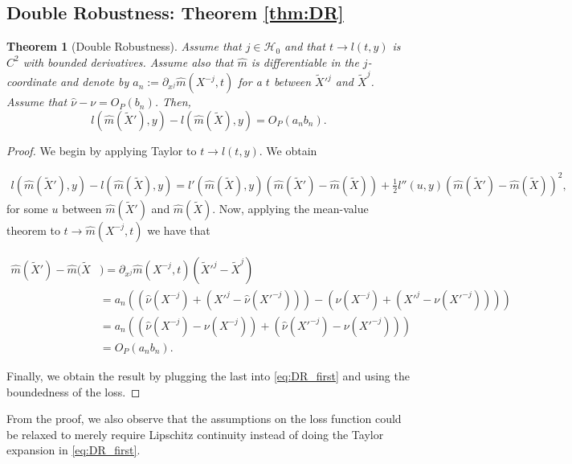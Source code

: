 \documentclass{article}
\theoremstyle{plain}
\newtheorem{theorem}{Theorem}[section]
\theoremstyle{definition}
\theoremstyle{remark}
\begin{document}
 
\subsection{Double Robustness: Theorem \ref{thm:DR}}

 \begin{theorem}[Double Robustness]
 Assume that $j\in \mathcal{H}_0$ and that $t\to l(t, y)$ is $C^2$ with bounded derivatives. Assume also that $\widehat{m}$ is differentiable in the $j$-coordinate and denote by $a_n:=\partial_{x^j}\widehat{m}(X^{-j}, t)$ for a $t$ between $\widetilde{X}'^{j}$ and $\widetilde{X}^j$. Assume that $\widehat{\nu}-\nu=O_P(b_n)$. Then, $$l(\widehat{m}(\widetilde{X}'), y)-l(\widehat{m}(\widetilde{X}), y)=O_P(a_n b_n).$$
 \end{theorem}
 
 
\begin{proof}
 We begin by applying Taylor to $t\to l(t, y)$. We obtain
 
 \begin{align}
     l(\widehat{m}(\widetilde{X}'), y)-l(\widehat{m}(\widetilde{X}), y)=l'(\widehat{m}(\widetilde{X}), y)(\widehat{m}(\widetilde{X}')-\widehat{m}(\widetilde{X}))+\frac{1}{2}l''(u, y)(\widehat{m}(\widetilde{X}')-\widehat{m}(\widetilde{X}))^2,\label{eq:DR_first}
 \end{align}
 for some $u$ between $\widehat{m}(\widetilde{X}')$ and $\widehat{m}(\widetilde{X})$.
 Now, applying the mean-value theorem to $t\to \widehat{m}(X^{-j}, t)$ we have that
 
 \begin{align*}
     \widehat{m}(\widetilde{X}')-\widehat{m}(\widetilde{X}&)=\partial_{x^j}\widehat{m}(X^{-j}, t)(\widetilde{X}'^j-\widetilde{X}^j)\\
     &=a_n\left(\left(\widehat{\nu}(X^{-j})+(X'^j-\widehat{\nu}(X'^{-j}))\right)-\left(\nu(X^{-j})+(X'^j-\nu(X'^{-j}))\right)\right)\\
     &= a_n\left(\left(\widehat{\nu}(X^{-j})-\nu(X^{-j})\right)+\left(\widehat{\nu}(X'^{-j})-\nu(X'^{-j})\right)\right)\\
     &= O_P(a_n b_n).
 \end{align*}
 
 Finally, we obtain the result by plugging the last into \eqref{eq:DR_first} and using the boundedness of the loss.
 
 
 \end{proof}

 From the proof, we also observe that the assumptions on the loss function could be relaxed to merely require Lipschitz continuity instead of doing the Taylor expansion in \eqref{eq:DR_first}.
 
\end{document}
